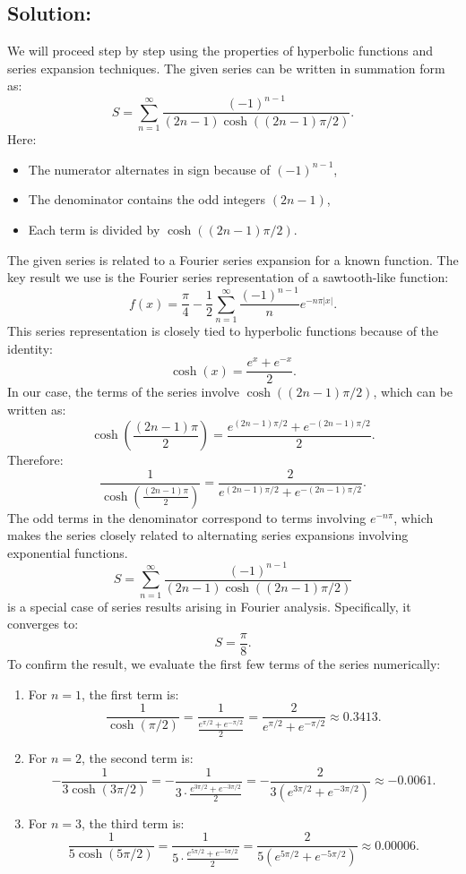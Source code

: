 \documentclass[12pt]{article}
\begin{document}
    \subsection*{Solution:}
        We will proceed step by step using the properties of hyperbolic functions and series expansion techniques.
        The given series can be written in summation form as:
        \[
        S = \sum_{n=1}^\infty \frac{(-1)^{n-1}}{(2n-1)\cosh((2n-1)\pi/2)}.
        \]
        Here:
        \begin{itemize}
            \item The numerator alternates in sign because of \((-1)^{n-1}\),
            \item The denominator contains the odd integers \((2n-1)\),
            \item Each term is divided by \(\cosh((2n-1)\pi/2)\).
        \end{itemize}
        The given series is related to a Fourier series expansion for a known function. The key result we use is the Fourier series representation of a sawtooth-like function:
        \[
        f(x) = \frac{\pi}{4} - \frac{1}{2} \sum_{n=1}^\infty \frac{(-1)^{n-1}}{n} e^{-n\pi |x|}.
        \]
        This series representation is closely tied to hyperbolic functions because of the identity:
        \[
        \cosh(x) = \frac{e^x + e^{-x}}{2}.
        \]
        In our case, the terms of the series involve \(\cosh((2n-1)\pi/2)\), which can be written as:
        \[
        \cosh\left(\frac{(2n-1)\pi}{2}\right) = \frac{e^{(2n-1)\pi/2} + e^{-(2n-1)\pi/2}}{2}.
        \]
        Therefore:
        \[
        \frac{1}{\cosh\left(\frac{(2n-1)\pi}{2}\right)} = \frac{2}{e^{(2n-1)\pi/2} + e^{-(2n-1)\pi/2}}.
        \]
        The odd terms in the denominator correspond to terms involving \(e^{-n\pi}\), which makes the series closely related to alternating series expansions involving exponential functions.
        \[
        S = \sum_{n=1}^\infty \frac{(-1)^{n-1}}{(2n-1)\cosh((2n-1)\pi/2)}
        \]
        is a special case of series results arising in Fourier analysis. Specifically, it converges to:
        \[
        S = \frac{\pi}{8}.
        \]
        To confirm the result, we evaluate the first few terms of the series numerically:
        \begin{enumerate}
            \item For \(n = 1\), the first term is:
            \[
            \frac{1}{\cosh(\pi/2)} = \frac{1}{\frac{e^{\pi/2} + e^{-\pi/2}}{2}} = \frac{2}{e^{\pi/2} + e^{-\pi/2}} \approx 0.3413.
            \]
            \item For \(n = 2\), the second term is:
            \[
            -\frac{1}{3\cosh(3\pi/2)} = -\frac{1}{3 \cdot \frac{e^{3\pi/2} + e^{-3\pi/2}}{2}} = -\frac{2}{3(e^{3\pi/2} + e^{-3\pi/2})} \approx -0.0061.
            \]
            \item For \(n = 3\), the third term is:
            \[
            \frac{1}{5\cosh(5\pi/2)} = \frac{1}{5 \cdot \frac{e^{5\pi/2} + e^{-5\pi/2}}{2}} = \frac{2}{5(e^{5\pi/2} + e^{-5\pi/2})} \approx 0.00006.
            \]
        \end{enumerate}
\end{document}
